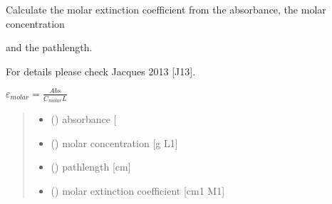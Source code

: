 \documentclass[letterpaper,10pt,english]{sphinxmanual}
\begin{document}
\begin{fulllineitems}
\label{\detokenize{03_absorption_coefficient:skinoptics.absorption_coefficient.molarext_from_Abs_and_Cmolar}}
\pysigstartsignatures
{}
\pysigstopsignatures
\begin{DUlineblock}{0em}
\item[] Calculate the molar extinction coefficient from the absorbance, the molar concentration
\item[] and the pathlength.
\item[] For details please check Jacques 2013 {[}J13{]}.
\end{DUlineblock}

\sphinxAtStartPar
\(\varepsilon_{molar} = \frac{Abs}{C_{molar} L}\)
\begin{quote}\begin{description}
\begin{itemize}
\item {} 
\sphinxAtStartPar
{} () \textendash{} absorbance {[}\sphinxhyphen{}{]}

\item {} 
\sphinxAtStartPar
{} () \textendash{} molar concentration {[}g L\sphinxhyphen{}1{]}

\item {} 
\sphinxAtStartPar
{} () \textendash{} pathlength {[}cm{]}

\end{itemize}

\sphinxAtStartPar
\begin{itemize}
\item {} 
\sphinxAtStartPar
{} () \textendash{} molar extinction coefficient {[}cm\sphinxhyphen{}1 M\sphinxhyphen{}1{]}

\end{itemize}


\end{description}\end{quote}

\end{fulllineitems}
\end{document}
